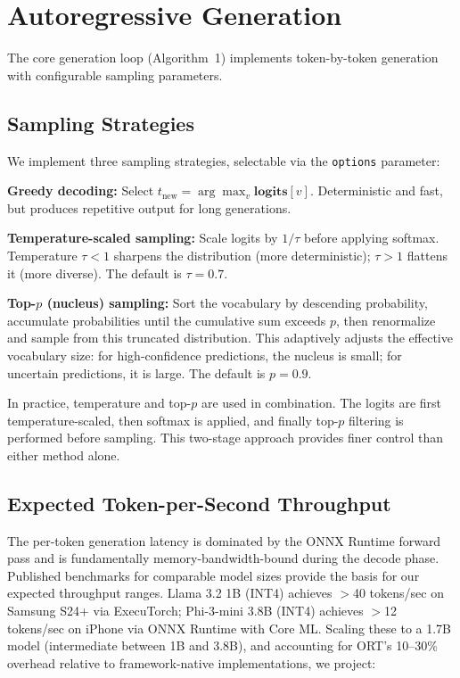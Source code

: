 \documentclass[12pt, letterpaper, twoside]{report}
\begin{document}
\section{Autoregressive Generation}
\label{sec:generation}

The core generation loop (Algorithm~1) implements token-by-token generation with configurable sampling parameters.

\subsection{Sampling Strategies}
\label{subsec:sampling}

We implement three sampling strategies, selectable via the \texttt{options} parameter:

\textbf{Greedy decoding:} Select $t_{\text{new}} = \arg\max_v \mathbf{logits}[v]$. Deterministic and fast, but produces repetitive output for long generations.

\textbf{Temperature-scaled sampling:} Scale logits by $1/\tau$ before applying softmax. Temperature $\tau < 1$ sharpens the distribution (more deterministic); $\tau > 1$ flattens it (more diverse). The default is $\tau = 0.7$.

\textbf{Top-$p$ (nucleus) sampling:} Sort the vocabulary by descending probability, accumulate probabilities until the cumulative sum exceeds $p$, then renormalize and sample from this truncated distribution. This adaptively adjusts the effective vocabulary size: for high-confidence predictions, the nucleus is small; for uncertain predictions, it is large. The default is $p = 0.9$.

In practice, temperature and top-$p$ are used in combination. The logits are first temperature-scaled, then softmax is applied, and finally top-$p$ filtering is performed before sampling. This two-stage approach provides finer control than either method alone.

\subsection{Expected Token-per-Second Throughput}
\label{subsec:throughput}

The per-token generation latency is dominated by the ONNX Runtime forward pass and is fundamentally memory-bandwidth-bound during the decode phase. Published benchmarks for comparable model sizes provide the basis for our expected throughput ranges. Llama 3.2 1B (INT4) achieves $>$40 tokens/sec on Samsung S24+ via ExecuTorch; Phi-3-mini 3.8B (INT4) achieves $>$12 tokens/sec on iPhone via ONNX Runtime with Core ML. Scaling these to a 1.7B model (intermediate between 1B and 3.8B), and accounting for ORT's 10--30\% overhead relative to framework-native implementations, we project:
\end{document}
